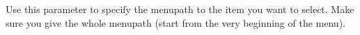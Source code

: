 
Use this parameter to specify the menupath to the item you want to select. Make sure you give the whole menupath (start from the very beginning of the menu).


